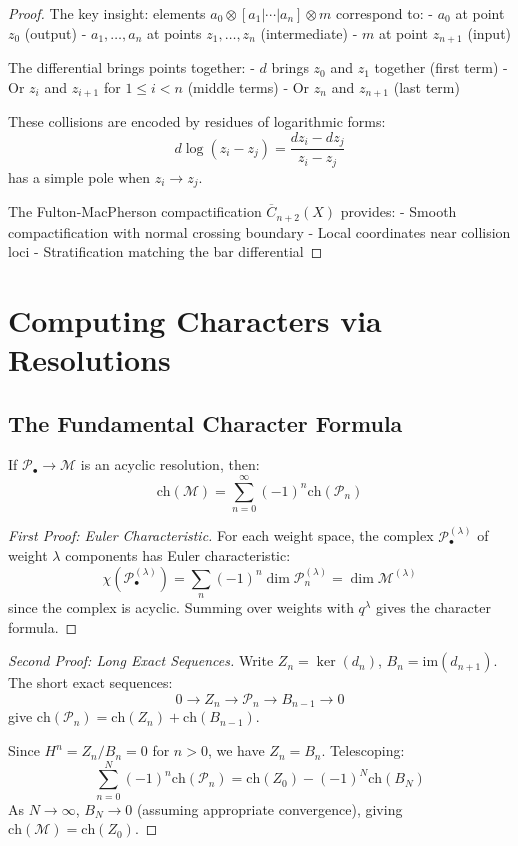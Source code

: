 \begin{proof}
The key insight: elements $a_0 \otimes [a_1|\cdots|a_n] \otimes m$ correspond to:
- $a_0$ at point $z_0$ (output)
- $a_1, \ldots, a_n$ at points $z_1, \ldots, z_n$ (intermediate)
- $m$ at point $z_{n+1}$ (input)

The differential brings points together:
- $d$ brings $z_0$ and $z_1$ together (first term)
- Or $z_i$ and $z_{i+1}$ for $1 \leq i < n$ (middle terms)
- Or $z_n$ and $z_{n+1}$ (last term)

These collisions are encoded by residues of logarithmic forms:
\[
d\log(z_i - z_j) = \frac{dz_i - dz_j}{z_i - z_j}
\]
has a simple pole when $z_i \to z_j$.

The Fulton-MacPherson compactification $\overline{C}_{n+2}(X)$ provides:
- Smooth compactification with normal crossing boundary
- Local coordinates near collision loci
- Stratification matching the bar differential
\end{proof}

\section{Computing Characters via Resolutions}

\subsection{The Fundamental Character Formula}

\begin{theorem}
If $\mathcal{P}_\bullet \to \mathcal{M}$ is an acyclic resolution, then:
\[
\text{ch}(\mathcal{M}) = \sum_{n=0}^\infty (-1)^n \text{ch}(\mathcal{P}_n)
\]
\end{theorem}

\begin{proof}[First Proof: Euler Characteristic]
For each weight space, the complex $\mathcal{P}_\bullet^{(\lambda)}$ of weight $\lambda$ components has Euler characteristic:
\[
\chi(\mathcal{P}_\bullet^{(\lambda)}) = \sum_n (-1)^n \dim \mathcal{P}_n^{(\lambda)} = \dim \mathcal{M}^{(\lambda)}
\]
since the complex is acyclic. Summing over weights with $q^{\lambda}$ gives the character formula.
\end{proof}

\begin{proof}[Second Proof: Long Exact Sequences]
Write $Z_n = \ker(d_n)$, $B_n = \text{im}(d_{n+1})$. The short exact sequences:
\[
0 \to Z_n \to \mathcal{P}_n \to B_{n-1} \to 0
\]
give $\text{ch}(\mathcal{P}_n) = \text{ch}(Z_n) + \text{ch}(B_{n-1})$.

Since $H^n = Z_n/B_n = 0$ for $n > 0$, we have $Z_n = B_n$. Telescoping:
\[
\sum_{n=0}^N (-1)^n \text{ch}(\mathcal{P}_n) = \text{ch}(Z_0) - (-1)^N \text{ch}(B_N)
\]
As $N \to \infty$, $B_N \to 0$ (assuming appropriate convergence), giving $\text{ch}(\mathcal{M}) = \text{ch}(Z_0)$.
\end{proof}

